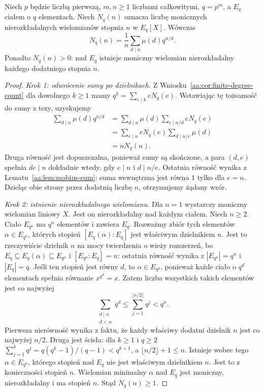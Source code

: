 \begin{twierdzenie}
\label{aa:tw:finite-irreducible-count}
Niech $p$ będzie liczbą pierwszą, $m,n\ge1$ liczbami
całkowitymi, $q=p^m$, a $E_q$ ciałem o $q$ elementach.
Niech $N_q(n)$ oznacza liczbę monicznych nierozkładalnych
wielomianów stopnia $n$ w $E_q[X]$. Wówczas
\[
N_q(n)=\frac1n\sum_{d\mid n}\mu(d)q^{n/d}.
\]
Ponadto $N_q(n)>0$: nad $E_q$ istnieje moniczny
wielomian nierozkładalny każdego dodatniego stopnia $n$.
\end{twierdzenie}
\begin{proof}
\emph{Krok 1: odwrócenie sumy po dzielnikach.}
Z Wniosku~\ref{aa:cor:finite-degree-count} dla dowolnego
$k\ge1$ mamy $q^k=\sum_{e\mid k}eN_q(e)$.
Wstawiając tę tożsamość do sumy z tezy, uzyskujemy
\[
\begin{aligned}
\sum_{d\mid n}\mu(d)q^{n/d}
&=\sum_{d\mid n}\mu(d)\sum_{e\mid n/d}eN_q(e)\\
&=\sum_{e\mid n}eN_q(e)\sum_{d\mid n/e}\mu(d)\\
&=nN_q(n).
\end{aligned}
\]
Druga równość jest dopuszczalna, ponieważ sumy są
skończone, a para $(d,e)$ spełnia $de\mid n$ dokładnie
wtedy, gdy $e\mid n$ i $d\mid n/e$. Ostatnia równość
wynika z Lematu~\ref{aa:lem:mobius-sum}: suma wewnętrzna
jest równa $1$ tylko dla $e=n$.
Dzieląc obie strony przez dodatnią liczbę $n$,
otrzymujemy żądany wzór.

\emph{Krok 2: istnienie nierozkładalnego wielomianu.}
Dla $n=1$ wystarczy moniczny wielomian liniowy $X$.
Jest on nierozkładalny nad każdym ciałem.
Niech $n\ge2$. Ciało $E_{q^n}$ ma $q^n$ elementów
i zawiera $E_q$. Rozważmy zbiór tych elementów
$\alpha\in E_{q^n}$, których stopień
$[E_q(\alpha):E_q]$ jest właściwym dzielnikiem $n$.
Jest to rzeczywiście dzielnik $n$ na mocy twierdzenia
o wieży rozszerzeń, bo $E_q\subseteq E_q(\alpha)
\subseteq E_{q^n}$ i $[E_{q^n}:E_q]=n$: ostatnia
równość wynika z $|E_{q^n}|=q^n$ i $|E_q|=q$.
Jeśli ten stopień jest równy $d$, to
$\alpha\in E_{q^d}$, ponieważ każde ciało o $q^d$
elementach spełnia równanie $x^{q^d}=x$.
Zatem liczba wszystkich takich elementów jest
co najwyżej
\[
\sum_{\substack{d\mid n\\d<n}}q^d
\le \sum_{j=1}^{\lfloor n/2\rfloor}q^j
<q^n.
\]
Pierwsza nierówność wynika z faktu, że każdy właściwy
dodatni dzielnik $n$ jest co najwyżej $n/2$.
Druga jest ścisła: dla $k\ge1$ i $q\ge2$
\(\sum_{j=1}^{k}q^j
=q(q^k-1)/(q-1)<q^{k+1}\), a
$\lfloor n/2\rfloor+1\le n$.
Istnieje wobec tego $\alpha\in E_{q^n}$, którego
stopień nad $E_q$ nie jest właściwym dzielnikiem $n$.
Jest to z konieczności stopień $n$. Wielomian minimalny
$\alpha$ nad $E_q$ jest moniczny, nierozkładalny i ma
stopień $n$. Stąd $N_q(n)\ge1$.
\end{proof}

